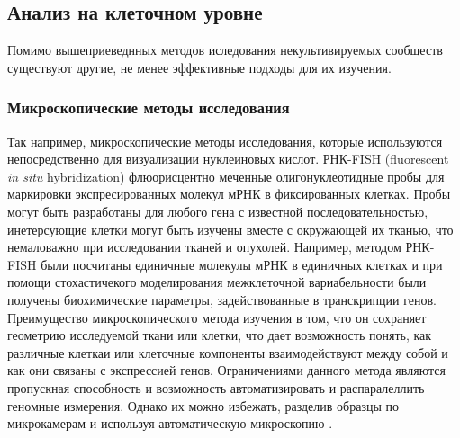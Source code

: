 \subsection{Анализ на клеточном уровне}
Помимо вышеприеведнных методов иследования некультивируемых сообществ существуют другие, не менее эффективные подходы для их изучения.

\subsubsection{Микроскопические методы исследования}
Так например, микроскопические методы исследования, которые используются непосредственно для визуализации нуклеиновых кислот. РНК-FISH (fluorescent \textit{in situ} hybridization)
флюорисцентно меченные олигонуклеотидные пробы для маркировки экспресированных молекул мРНК в фиксированных клетках. Пробы могут быть разработаны для любого гена с
известной последовательностью, инетерсующие клетки могут быть изучены вместе с окружающей их тканью, что немаловажно при исследовании тканей и опухолей. Например, методом
РНК-FISH были посчитаны единичные молекулы мРНК в единичных клетках и при помощи
стохастичекого моделирования межклеточной вариабельности были получены биохимические
параметры, задействованные в транскрипции генов. Преимущество микроскопического метода изучения в том, что он сохраняет геометрию исследуемой ткани или клетки, что дает
возможность понять, как различные клеткаи или клеточные компоненты взаимодействуют
между собой и как они связаны с экспрессией генов. Ограничениями данного метода являются пропускная способность и возможность автоматизировать и распаралеллить геномные
измерения. Однако их можно избежать, разделив образцы по микрокамерам и используя
автоматическую микроскопию \cite{Kalisky2014}.

